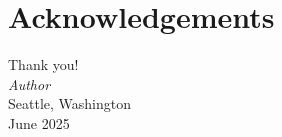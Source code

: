 %

\chapter*{Acknowledgements}


\lipsum[1]
Thank you! \\

\vspace{1em}
\mbox{} \hfill \textit{Author}\\
\mbox{} \hfill Seattle, Washington\vspace{-0.35pc}\\
\mbox{} \hfill June 2025
